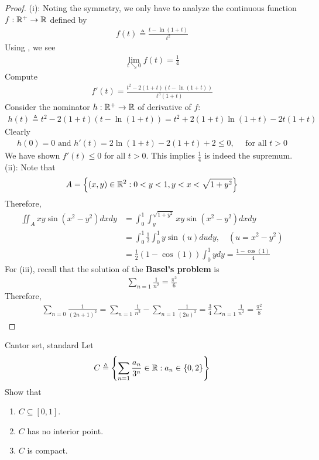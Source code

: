 \documentclass{report}
\begin{document}
\begin{proof}
(i): Noting the symmetry, we only have to analyze the continuous function $f:\mathbb{R}^+ \rightarrow \mathbb{R}$ defined by 
\begin{align*}
f(t) \triangleq  \frac{t- \ln (1+t)}{t^2}
\end{align*}
Using , we see 
\begin{align*}
\lim_{t\searrow 0} f(t)=\frac{1}{4}
\end{align*}
Compute 
\begin{align*}
f'(t)= \frac{t^2-2(1+t)\left(t- \ln (1+t) \right)}{t^3(1+t)}  
\end{align*}
Consider the nominator $h:\mathbb{R}^+ \rightarrow \mathbb{R}$ of derivative of $f$: 
\begin{align*}
h(t)\triangleq t^2-  2(1+t)\left(t- \ln (1+t) \right)= t^2 +2(1+t) \ln (1+t)- 2t(1+t)  
\end{align*}
Clearly  
\begin{align*}
h(0)=0\text{ and }h'(t)= 2\ln (1+t)- 2 (1+t) + 2 \leq 0,\quad \text{ for all }t>0 
\end{align*}
We have shown $f'(t)\leq 0$ for all $t>0$. This implies $\frac{1}{4}$ is indeed the supremum.  \\


(ii): Note that 
\begin{align*}
A= \left\{ (x,y)\in\mathbb{R}^2: 0<y<1, y<x< \sqrt{1+y^2} \right\}
\end{align*}
Therefore, 
\begin{align*}
\iint_A xy \sin (x^2-y^2)dxdy&= \int_0^1 \int_y^{\sqrt{1+y^2}}  xy \sin (x^2-y^2) dx dy \\
&=\int_0^1 \frac{1}{2}\int_0^{1} y \sin (u)du dy,\quad (u=x^2-y^2) \\
&= \frac{1}{2}(1- \cos (1))\int_0^1 ydy= \frac{1- \cos (1)}{4}
\end{align*}
For (iii), recall that the solution of the \textbf{Basel's problem} is 
\begin{align*}
\sum_{n=1} \frac{1}{n^2} = \frac{\pi^2 }{6}
\end{align*}
Therefore, 
\begin{align*}
\sum_{n=0} \frac{1}{(2n+1)^2} = \sum_{n=1} \frac{1}{n^2} - \sum_{n=1} \frac{1}{(2n)^2}= \frac{3}{4} \sum_{n=1} \frac{1}{n^2}= \frac{\pi^2}{8} 
\end{align*}
\end{proof}
\begin{question}{Cantor set, standard}{}
Let 
\begin{align*}
C\triangleq \left\{ \sum_{n=1} \frac{a_n}{3^n}\in\mathbb{R}: a_n \in \left\{ 0,2 \right\} \right\}
\end{align*}
Show that 
\begin{enumerate}[label=(\roman*)]
  \item $C \subseteq [0,1]$. 
  \item $C$ has no interior point.  
  \item $C$ is compact. 
\end{enumerate}
\end{question}
\end{document}
